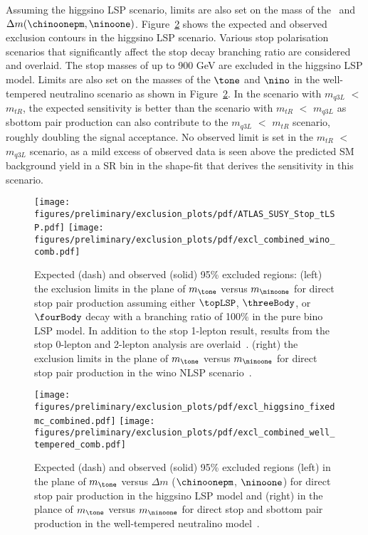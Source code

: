 \documentclass[UKenglish,10pt]{article}
\begin{document}
\hspace{-0.60cm}
Assuming the higgsino LSP scenario, limits are also set on the mass of the \tone\ and $\Delta m(\chinoonepm,\ninoone)$. Figure~\ref{fig:higgsino-summary} shows the expected and observed exclusion contours in the higgsino LSP scenario. Various stop polarisation scenarios that significantly affect the stop decay branching ratio are considered and overlaid. The stop masses of up to 900 GeV are excluded in the higgsino LSP model. Limits are also set on the masses of the $\tone$ and $\nino$ in the well-tempered neutralino scenario as shown in Figure~\ref{fig:higgsino-summary}. In the scenario with $m_{q3L}$ $<$ $m_{tR}$, the expected sensitivity is better than the scenario with $m_{tR}$ $<$ $m_{q3L}$ as sbottom pair production can also contribute to the $m_{q3L}$ $<$ $m_{tR}$ scenario, roughly doubling the signal acceptance. No observed limit is set in the $m_{tR}$ $<$ $m_{q3L}$ scenario, as a mild excess of observed data is seen above the predicted SM background yield in a SR bin in the shape-fit that derives the sensitivity in this scenario.

\begin{figure}[htbp]
        \centering
        \texttt{[image: figures/preliminary/exclusion\_plots/pdf/ATLAS\_SUSY\_Stop\_tLSP.pdf]}%
        \texttt{[image: figures/preliminary/exclusion\_plots/pdf/excl\_combined\_wino\_comb.pdf]}
        \caption{Expected (dash) and observed (solid) 95\% excluded regions: (left) the exclusion limits in the plane of $m_{\tone}$ versus $m_{\ninoone}$ for direct stop pair production assuming either $\topLSP$, $\threeBody$, or $\fourBody$ decay with a branching ratio of 100\% in the pure bino LSP model. In addition to the stop 1-lepton result, results from the stop 0-lepton and 2-lepton analysis are overlaid~\cite{ATL-CONF-2017-034,ATL-CONF-2017-020,ATL-SUSYPublic}. (right) the exclusion limits in the plane of $m_{\tone}$ versus $m_{\ninoone}$ for direct stop pair production in the wino NLSP scenario~\cite{ATL-CONF-2017-037}. 
        }
        \label{fig:stop-summary}
\end{figure}

\begin{figure}[htbp]
        \centering
        \texttt{[image: figures/preliminary/exclusion\_plots/pdf/excl\_higgsino\_fixedmc\_combined.pdf]}
        \texttt{[image: figures/preliminary/exclusion\_plots/pdf/excl\_combined\_well\_tempered\_comb.pdf]}%
        \caption{Expected (dash) and observed (solid) 95\% excluded regions (left) in the plane of $m_{\tone}$ versus $\Delta m$ ($\chinoonepm$, $\ninoone$) for direct stop pair production in the higgsino LSP model and (right) in the plance of $m_{\tone}$ versus $m_{\ninoone}$ for direct stop and sbottom pair production in the well-tempered neutralino model~\cite{ATL-CONF-2017-037}.
        }
        \label{fig:higgsino-summary}
\end{figure}
\end{document}
